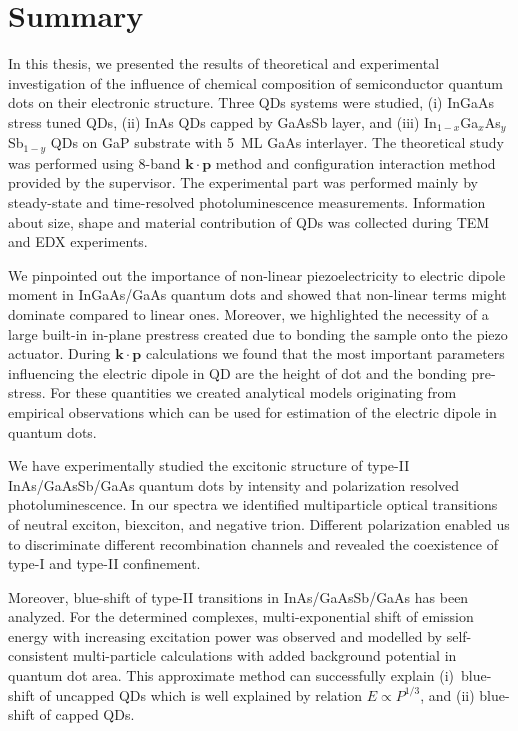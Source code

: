
\chapter{Summary}\label{chap:summary}

In this thesis, we presented the results of theoretical and experimental investigation of the influence of chemical composition of semiconductor quantum dots on their electronic structure. Three QDs systems were studied, (i) InGaAs stress tuned QDs, (ii) InAs QDs capped by GaAsSb layer, and (iii) In$_{1-x}$Ga$_x$As$_y$Sb$_{1-y}$ QDs on GaP substrate with 5~ML GaAs interlayer. The theoretical study was performed using 8-band $\mathbf{k\cdot p}$ method and configuration interaction method provided by the supervisor. The experimental part was performed mainly by steady-state and time-resolved photoluminescence measurements. Information about size, shape and material contribution of QDs was collected during TEM and EDX experiments.

We pinpointed out the importance of non-linear piezoelectricity to electric dipole moment in InGaAs/GaAs quantum dots and showed that non-linear terms might dominate compared to linear ones. Moreover, we highlighted the necessity of a large built-in in-plane prestress created due to bonding the sample onto the piezo actuator. During $\mathbf{k\cdot p}$ calculations we found that the most important parameters influencing the electric dipole in QD are the height of dot and the bonding pre-stress. For these quantities we created analytical models originating from empirical observations which can be used for estimation of the electric dipole in quantum dots.

We have experimentally studied the excitonic structure of type-II InAs/GaAsSb/GaAs quantum dots by intensity and polarization resolved photoluminescence. In our spectra we identified multiparticle optical transitions of neutral exciton, biexciton, and negative trion. Different polarization enabled us to discriminate different recombination channels and revealed the coexistence of type-I and type-II confinement.

Moreover, blue-shift of type-II transitions in InAs/GaAsSb/GaAs has been analyzed. For the determined complexes, multi-exponential shift of emission energy with increasing excitation power was observed and modelled by self-consistent multi-particle calculations with added background potential in quantum dot area. This approximate method can successfully explain (i)~blue-shift of uncapped QDs which is well explained by relation $E\propto P^{1/3}$, and (ii) blue-shift of capped QDs.

